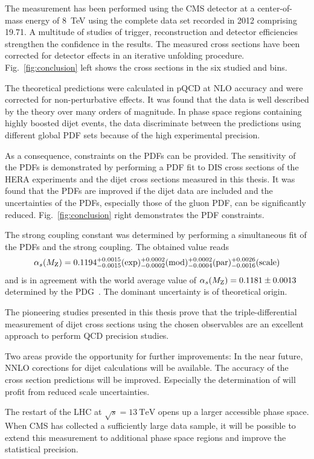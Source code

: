 The measurement has been performed using the CMS detector at a center-of-mass
energy of \SI{8}{\TeV} using the complete data set recorded in 2012 comprising
\SI{19.71}{\fbinv}. A multitude of studies of trigger, reconstruction and
detector efficiencies strengthen the confidence in the results. The measured
cross sections have been corrected for detector effects in an iterative
unfolding procedure. Fig.~\ref{fig:conclusion} left shows the
cross sections in the six studied \ystar and \yboost bins.

The theoretical predictions were calculated in pQCD at NLO accuracy and were
corrected for non-perturbative effects. It was found that the data is well
described by the theory over many orders of magnitude. In phase space regions
containing highly boosted dijet events, the data discriminate between the
predictions using different global PDF sets because of the high experimental
precision.

As a consequence, constraints on the PDFs can be provided. The sensitivity of
the PDFs is demonstrated by performing a PDF fit to DIS cross sections of the
HERA experiments and the dijet cross sections measured in this thesis. It was
found that the PDFs are improved if the dijet data are included and the
uncertainties of the PDFs, especially those of the gluon PDF, can be
significantly reduced. Fig.~\ref{fig:conclusion} right demonstrates the PDF
constraints.

The strong coupling constant \asmz was determined by performing a simultaneous
fit of the PDFs and the strong coupling. The obtained value reads
%
\begin{equation*}
  \alpha_{s}(M_\mathrm{Z}) = 0.1194_{-0.0015}^{+0.0015}(\mathrm{exp})_{-0.0002}^{+0.0002}(\mathrm{mod})_{-0.0004}^{+0.0002}(\mathrm{par})_{-0.0016}^{+0.0026}(\mathrm{scale})
\end{equation*}
%
and is in agreement with the world average value of $\alpha_{s}(M_\mathrm{Z}) = 0.1181 \pm
0.0013$ determined by the PDG~\cite{Agashe:2014kda}. The dominant uncertainty is
of theoretical origin.

The pioneering studies presented in this thesis prove that the triple-differential
measurement of dijet cross sections using the chosen observables are an
excellent approach to perform QCD precision studies.

Two areas provide the opportunity for further improvements: In the near future,
NNLO corections for dijet calculations will be available. The accuracy of the
cross section predictions will be improved. Especially the determination of
\asmz will profit from reduced scale uncertainties. 

The restart of the LHC at $\sqrt{s}=\SI{13}{\TeV}$ opens up a larger accessible
phase space. When CMS has collected a sufficiently large data sample, it will be
possible to extend this measurement to additional phase space regions and
improve the statistical precision.

